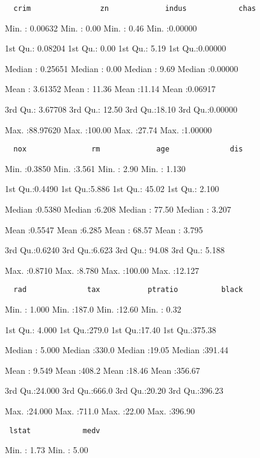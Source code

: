 \documentclass[]{article}
\begin{document}
\begin{verbatim}
  crim                zn             indus            chas         
\end{verbatim}

Min. : 0.00632 Min. : 0.00 Min. : 0.46 Min. :0.00000

1st Qu.: 0.08204 1st Qu.: 0.00 1st Qu.: 5.19 1st Qu.:0.00000

Median : 0.25651 Median : 0.00 Median : 9.69 Median :0.00000

Mean : 3.61352 Mean : 11.36 Mean :11.14 Mean :0.06917

3rd Qu.: 3.67708 3rd Qu.: 12.50 3rd Qu.:18.10 3rd Qu.:0.00000

Max. :88.97620 Max. :100.00 Max. :27.74 Max. :1.00000

\begin{verbatim}
  nox               rm             age              dis         
\end{verbatim}

Min. :0.3850 Min. :3.561 Min. : 2.90 Min. : 1.130

1st Qu.:0.4490 1st Qu.:5.886 1st Qu.: 45.02 1st Qu.: 2.100

Median :0.5380 Median :6.208 Median : 77.50 Median : 3.207

Mean :0.5547 Mean :6.285 Mean : 68.57 Mean : 3.795

3rd Qu.:0.6240 3rd Qu.:6.623 3rd Qu.: 94.08 3rd Qu.: 5.188

Max. :0.8710 Max. :8.780 Max. :100.00 Max. :12.127

\begin{verbatim}
  rad              tax           ptratio          black        
\end{verbatim}

Min. : 1.000 Min. :187.0 Min. :12.60 Min. : 0.32

1st Qu.: 4.000 1st Qu.:279.0 1st Qu.:17.40 1st Qu.:375.38

Median : 5.000 Median :330.0 Median :19.05 Median :391.44

Mean : 9.549 Mean :408.2 Mean :18.46 Mean :356.67

3rd Qu.:24.000 3rd Qu.:666.0 3rd Qu.:20.20 3rd Qu.:396.23

Max. :24.000 Max. :711.0 Max. :22.00 Max. :396.90

\begin{verbatim}
 lstat            medv       
\end{verbatim}

Min. : 1.73 Min. : 5.00
\end{document}

